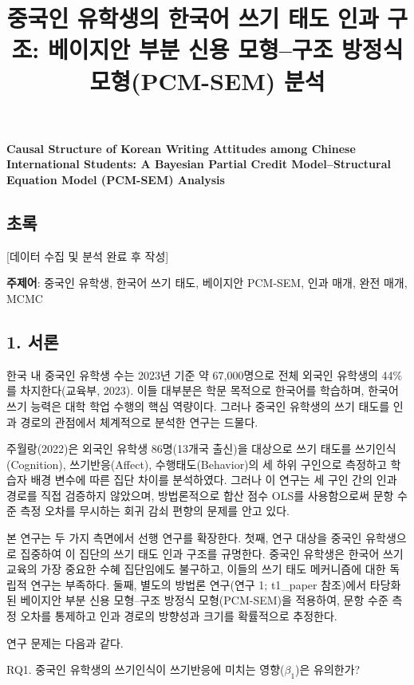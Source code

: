 \documentclass[a4paper,10pt]{oblivoir}
\begin{document}
\title{중국인 유학생의 한국어 쓰기 태도 인과 구조: 베이지안 부분 신용 모형–구조 방정식 모형(PCM-SEM) 분석}
\maketitle

\textbf{Causal Structure of Korean Writing Attitudes among Chinese International Students: A Bayesian Partial Credit Model–Structural Equation Model (PCM-SEM) Analysis}


\subsection{초록}

[데이터 수집 및 분석 완료 후 작성]

\textbf{주제어}: 중국인 유학생, 한국어 쓰기 태도, 베이지안 PCM-SEM, 인과 매개, 완전 매개, MCMC


\subsection{1. 서론}

한국 내 중국인 유학생 수는 2023년 기준 약 67,000명으로 전체 외국인 유학생의 44\%를 차지한다(교육부, 2023). 이들 대부분은 학문 목적으로 한국어를 학습하며, 한국어 쓰기 능력은 대학 학업 수행의 핵심 역량이다. 그러나 중국인 유학생의 쓰기 태도를 인과 경로의 관점에서 체계적으로 분석한 연구는 드물다.

주월랑(2022)은 외국인 유학생 86명(13개국 출신)을 대상으로 쓰기 태도를 쓰기인식(Cognition), 쓰기반응(Affect), 수행태도(Behavior)의 세 하위 구인으로 측정하고 학습자 배경 변수에 따른 집단 차이를 분석하였다. 그러나 이 연구는 세 구인 간의 인과 경로를 직접 검증하지 않았으며, 방법론적으로 합산 점수 OLS를 사용함으로써 문항 수준 측정 오차를 무시하는 회귀 감쇠 편향의 문제를 안고 있다.

본 연구는 두 가지 측면에서 선행 연구를 확장한다. 첫째, 연구 대상을 중국인 유학생으로 집중하여 이 집단의 쓰기 태도 인과 구조를 규명한다. 중국인 유학생은 한국어 쓰기 교육의 가장 중요한 수혜 집단임에도 불구하고, 이들의 쓰기 태도 메커니즘에 대한 독립적 연구는 부족하다. 둘째, 별도의 방법론 연구(연구 1; t1\_paper 참조)에서 타당화된 베이지안 부분 신용 모형–구조 방정식 모형(PCM-SEM)을 적용하여, 문항 수준 측정 오차를 통제하고 인과 경로의 방향성과 크기를 확률적으로 추정한다.

연구 문제는 다음과 같다.

RQ1. 중국인 유학생의 쓰기인식이 쓰기반응에 미치는 영향($\beta_1$)은 유의한가?
\end{document}
